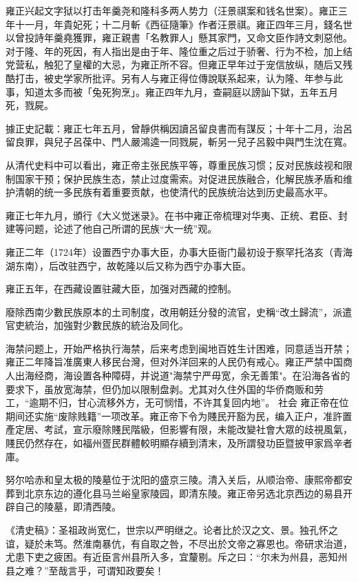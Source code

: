 雍正兴起文字狱以打击年羹尧和隆科多两人势力（汪景祺案和钱名世案）。雍正三年十一月，年貴妃死；十二月斬《西征隨筆》作者汪景祺。雍正四年三月，錢名世以曾投詩年羹堯獲罪，雍正親書「名教罪人」懸其家門，又命文臣作詩文刺惡他。对于隆、年的死因，有人指出是由于年、隆位重之后过于骄奢、行为不检，加上结党营私，触犯了皇權的大忌，为雍正所不容。但雍正早年过于宠信放纵，随后又残酷打击，被史学家所批评。另有人与雍正得位傳說联系起来，认为隆、年参与此事，知道太多而被「兔死狗烹」。雍正四年九月，查嗣庭以謗訕下獄，五年五月死，戮屍。

據正史記載：雍正七年五月，曾靜供稱因讀呂留良書而有謀反；十年十二月，治呂留良罪，與兒子呂葆中、門人嚴鴻逵一同戮屍，斬另一兒子呂毅中與門生沈在寬。

从清代史料中可以看出，雍正帝主张民族平等，尊重民族习惯；反对民族歧视和限制国家干预；保护民族生态，禁止过度需索。对促进民族融合，化解民族矛盾和维护清朝的统一多民族有着重要贡献，也使清代的民族统治达到历史最高水平。

雍正七年九月，頒行《大义觉迷录》。在书中雍正帝梳理对华夷、正统、君臣、封建等问题，论述了他自己所谓的民族“大一统”观。

雍正二年（1724年）设置西宁办事大臣，办事大臣衙门最初设于察罕托洛亥（青海湖东南），后改驻西宁，故乾隆以后又称为西宁办事大臣。

雍正五年，在西藏设置驻藏大臣，加强对西藏的控制。

廢除西南少數民族原本的土司制度，改用朝廷分發的流官，史稱“改土歸流”，派遣官吏統治，加強對少數民族的統治及同化。

海禁问题上，开始严格执行海禁，后来考虑到闽地百姓生计困难，同意适当开禁；雍正二年降旨准廣東人移民台灣，但对外洋回来的人民仍有戒心。雍正严禁中国商人出海经商，海设置各种障碍，并说道"海禁宁严毋宽，余无善策"。在沿海各省的要求下，虽放宽海禁，但仍加以限制盘剥。尤其对久住外国的华侨商贩和劳工，“逾期不归，甘心流移外方，无可悯惜，不许其复回内地”。
社会
雍正帝在位期间还实施“废除贱籍”一项改革。雍正帝下令为賤民开豁为民，编入正户，准許置產定居、考試，宣示廢除賤民階級，但影響有限，未能改變社會大眾的歧視風氣，賤民仍然存在，如福州疍民群體較明顯存續到清末，及所謂發功臣暨披甲家爲辛者庫。

努尔哈赤和皇太极的陵墓位于沈阳的盛京三陵。清入关后，从顺治帝、康熙帝都安葬到北京东边的遵化县马兰峪皇家陵园，即清东陵。雍正帝另选北京西边的易县开辟自己的陵墓，即清西陵。

《清史稿》：圣祖政尚宽仁，世宗以严明继之。论者比於汉之文、景。独孔怀之谊，疑於未笃。然淮南暴伉，有自取之咎，不尽出於文帝之寡恩也。帝研求治道，尤患下吏之疲困。有近臣言州县所入多，宜釐剔。斥之曰：“尔未为州县，恶知州县之难？”至哉言乎，可谓知政要矣！

